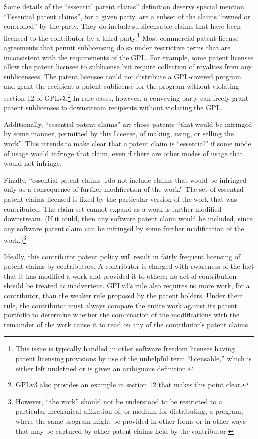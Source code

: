 Some details of the ``essential patent claims'' definition deserve special
mention.  ``Essential patent claims'', for a given party, are a subset of the
claims ``owned or controlled'' by the party.  They do include sublicensable
claims that have been licensed to the contributor by a third
party.\footnote{This issue is typically handled in other software freedom
  licenses having patent licensing provisions by use of the unhelpful term
  ``licensable,'' which is either left undefined or is given an ambiguous
  definition.}  Most commercial patent license agreements that permit
sublicensing do so under restrictive terms that are inconsistent with the
requirements of the GPL\@.  For example, some patent licenses allow the
patent licensee to sublicense but require collection of royalties from any
sublicensees.  The patent licensee could not distribute a GPL-covered program
and grant the recipient a patent sublicense for the program without violating
section 12 of GPLv3.\footnote{GPLv3 also provides an example in section 12
  that makes this point clear.}  In rare cases, however, a conveying party
can freely grant patent sublicenses to downstream recipients without
violating the GPL\@.

Additionally, ``essential patent claims'' are those patents ``that would be
infringed by some manner, permitted by this License, of making, using, or
selling the work''.  This intends to make clear that a patent claim is
``essential'' if some mode of usage would infringe that claim, even if there
are other modes of usage that would not infringe.

Finally, ``essential patent claims \ldots do not include
claims that would be infringed only as a consequence of further
modification of the work.''  The set of essential patent
claims licensed  is fixed by the
particular version of the work that was contributed.  The claim set
cannot expand as a work is further modified downstream.  (If it could,
then any software patent claim would be included, since any software
patent claim can be infringed by some further modification of the
work.)\footnote{However, ``the work'' should not be understood to be
restricted to a particular mechanical affixation of, or medium for
distributing, a program, where the same program might be provided in
other forms or in other ways that may be captured by other patent claims
held by the contributor.}

\medskip

Ideally, this contributor patent policy will result in fairly frequent licensing of patent
claims by contributors.  A contributor is charged with awareness of the fact
that it has modified a work and provided it to others; no act of contribution
should be treated as inadvertent.  GPLv3's rule also requires no more work, for a
contributor, than the weaker rule proposed by the patent holders.  Under
their rule, the contributor must always compare the entire work against its
patent portfolio to determine whether the combination of the modifications
with the remainder of the work cause it to read on any of the contributor's
patent claims.

